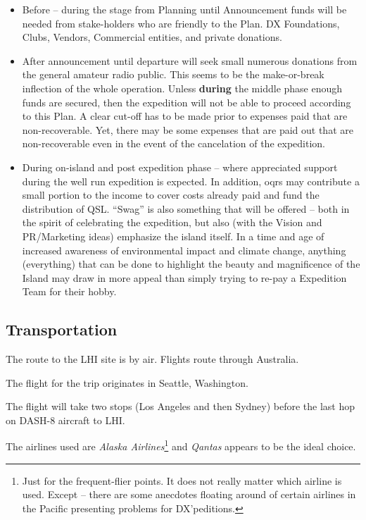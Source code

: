 \documentclass[11pt]{article}
\begin{document}
\begin{itemize}
\item Before -- during the stage from Planning until Announcement
funds will be needed from stake-holders who are friendly to the
Plan.   DX Foundations, Clubs, Vendors, Commercial entities,
and private donations.
\item After announcement until departure will seek small
numerous donations from the general amateur radio public.  This
seems to be the make-or-break inflection of the whole operation.
Unless {\textbf{during}} the middle phase enough funds are secured,
then the expedition will not be able to proceed according to this Plan.
A clear cut-off has to be made prior to expenses paid that are 
non-recoverable.   Yet, there may be some expenses that are paid
out that are non-recoverable even in the event of the cancelation
of the expedition.
\item During on-island and post expedition phase -- where 
appreciated support during the well run expedition is expected.  In
addition, {\gls{oqrs}} may contribute a small portion to the
income to cover costs already paid and fund the distribution of
QSL.   ``Swag'' is also something that will be offered -- both
in the spirit of celebrating the expedition, but also (with the
Vision and PR/Marketing ideas) emphasize the island itself.
In a time and age of increased awareness of environmental
impact and climate change, anything (everything) that can be
done to highlight the beauty and magnificence of the Island
may draw in more appeal than simply trying to re-pay
a Expedition Team for their hobby.
\end{itemize}

\subsection{Transportation}

The route to the LHI site is by air.  Flights route through
Australia.
\par
The flight for the trip originates in Seattle, Washington.
\par
The flight will take two stops (Los Angeles and then Sydney)
before the last hop on DASH-8 aircraft to LHI.

\par
The airlines used are {\textit{Alaska Airlines}}\footnote{
Just for the frequent-flier points.  It does not really
matter which airline is used.  Except -- there are
some anecdotes floating around of certain airlines
in the Pacific presenting problems for DX'peditions.} 
 and {\textit{Qantas}} appears to be the ideal choice.  
\end{document}
